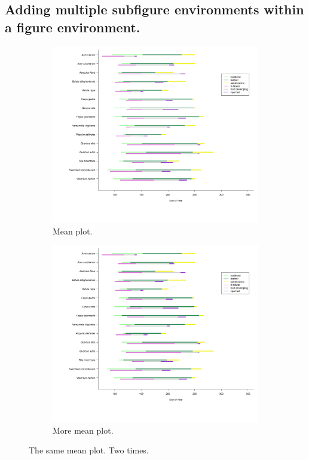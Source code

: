 \documentclass[a4paper, 12pt]{article}
\begin{document}
\subsection{Adding multiple subfigure environments within a figure environment.}
\begin{figure}[h!]
  \centering
  \begin{subfigure}[b]{0.45\linewidth}
    \includegraphics[width=\linewidth]{Figures/improved_resolution_thanlyou_cairo.png}
    \caption{Mean plot.}
  \end{subfigure}
  \begin{subfigure}[b]{0.45\linewidth}
    \includegraphics[width=\linewidth]{Figures/improved_resolution_thanlyou_cairo.png}
    \caption{More mean plot.}
  \end{subfigure}
  \caption{The same mean plot. Two times.}
  \label{fig:meanplot}
\end{figure}
\newpage
\end{document}
